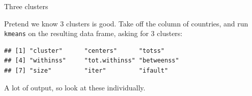 \documentclass[
  ignorenonframetext,
]{beamer}
\newenvironment{Shaded}{\begin{snugshade}}{\end{snugshade}}
\newcommand{\DecValTok}[1]{\textcolor[rgb]{0.00,0.00,0.81}{#1}}
\newcommand{\KeywordTok}[1]{\textcolor[rgb]{0.13,0.29,0.53}{\textbf{#1}}}
\newcommand{\NormalTok}[1]{#1}
\newcommand{\OperatorTok}[1]{\textcolor[rgb]{0.81,0.36,0.00}{\textbf{#1}}}
\newcommand{\StringTok}[1]{\textcolor[rgb]{0.31,0.60,0.02}{#1}}
\begin{document}
\begin{frame}[fragile]{Three clusters}
\protect\hypertarget{three-clusters}{}

Pretend we know 3 clusters is good. Take off the column of countries,
and run \texttt{kmeans} on the resulting data frame, asking for 3
clusters:

\begin{Shaded}
\end{Shaded}

\begin{verbatim}
## [1] "cluster"      "centers"      "totss"       
## [4] "withinss"     "tot.withinss" "betweenss"   
## [7] "size"         "iter"         "ifault"
\end{verbatim}

A lot of output, so look at these individually.

\end{frame}
\end{document}
